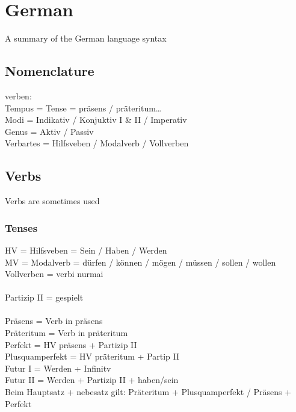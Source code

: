 \section{German}
\newcommand\arrow{$\,\Rightarrow\,$ }

A summary of the German language syntax

\subsection{Nomenclature}
verben:\\
Tempus = Tense = präsens / präteritum\dots\\
Modi = Indikativ / Konjuktiv I \& II / Imperativ\\
Genus = Aktiv / Passiv\\
Verbartes = Hilfsveben / Modalverb / Vollverben

\subsection{Verbs}

Verbs are sometimes used

\subsubsection{Tenses}

HV = Hilfsveben = Sein / Haben / Werden \\
MV = Modalverb = dürfen / können / mögen / müssen / sollen / wollen \\
Vollverben = verbi nurmai \\
\\
Partizip II = gespielt \\
\\
Präsens = Verb in präsens \\
Präteritum = Verb in präteritum \\
Perfekt = HV präsens + Partizip II \\
Plusquamperfekt = HV präteritum + Partip II \\
Futur I = Werden + Infinitv \\
Futur II = Werden + Partizip II + haben/sein \\

Beim Hauptsatz + nebesatz gilt: Präteritum + Plusquamperfekt / Präsens + Perfekt

